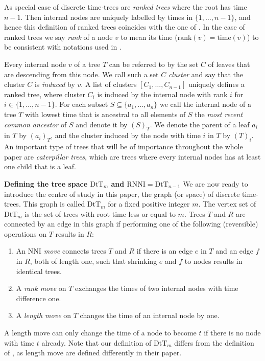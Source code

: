 \documentclass[11pt]{amsart}
\newcommand{\rnni}{\mathrm{RNNI}}
\newcommand{\rank}{\mathrm{rank}}
\newcommand{\ntime}{\mathrm{time}}
\newcommand{\nni}{\mathrm{NNI}}
\newcommand{\dtt}{\mathrm{DtT}}
\newcommand{\summary}[1]{\textbf{#1}} %
\begin{document}
As special case of discrete time-trees are \emph{ranked trees} where the root has time $n-1$.
Then internal nodes are uniquely labelled by times in $\{1, \ldots, n-1\}$, and hence this definition of ranked trees coincides with the one of \textcite{Collienne2020-iu}.
In the case of ranked trees we say \emph{rank} of a node $v$ to mean its time ($\rank(v) = \ntime(v)$) to be consistent with notations used in \autocite{Collienne2020-iu}.

Every internal node $v$ of a tree $T$ can be referred to by the set $C$ of leaves that are descending from this node.
We call such a set $C$ \emph{cluster} and say that the cluster $C$ is \emph{induced} by $v$.
A list of clusters $[C_1, \ldots, C_{n-1}]$ uniquely defines a ranked tree, where cluster $C_i$ is induced by the internal node with rank $i$ for $i \in \{1, \ldots, n-1\}$.
For each subset $S \subseteq \{a_1, \ldots, a_n\}$ we call the internal node of a tree $T$ with lowest time that is ancestral to all elements of $S$ the \emph{most recent common ancestor} of $S$ and denote it by $(S)_T$.
We denote the parent of a leaf $a_i$ in $T$ by $(a_i)_T$, and the cluster induced by the node with time $i$ in $T$ by $(T)_i$.
An important type of trees that will be of importance throughout the whole paper are \emph{caterpillar trees}, which are trees where every internal nodes has at least one child that is a leaf.

\summary{Defining the tree space $\dtt_m$ and $\rnni = \dtt_{n-1}$}
We are now ready to introduce the centre of study in this paper, the graph (or space) of discrete time-trees.
This graph is called $\dtt_m$ for a fixed positive integer $m$.
The vertex set of $\dtt_m$ is the set of trees with root time less or equal to $m$.
Trees $T$ and $R$ are connected by an edge in this graph if performing one of the following (reversible) operations on $T$ results in $R$:
\begin{enumerate}
	\item An \emph{$\nni$ move} connects trees $T$ and $R$ if there is an edge $e$ in $T$ and an edge $f$ in $R$, both of length one, such that shrinking $e$ and $f$ to nodes results in identical trees.
	\item A \emph{rank move} on $T$ exchanges the times of two internal nodes with time difference one.
	\item A \emph{length move} on $T$ changes the time of an internal node by one.
\end{enumerate}
A length move can only change the time of a node to become $t$ if there is no node with time $t$ already.
Note that our definition of $\dtt_m$ differs from the definition of \textcite{Gavryushkin2018-ol}, as length move are defined differently in their paper.
\end{document}

